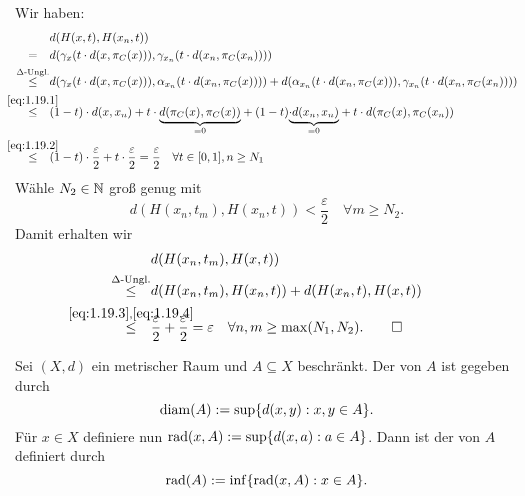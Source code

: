 \begin{beweis}
\begin{figure}[h]
	\end{figure}
	
	Wir haben:
	\begin{align}
		&d(H(x,t),H(x_n,t)) \\
		\stack{}{=} &d(\gamma_x(t\cdot d(x,\pi_C(x))),\gamma_{x_n}(t\cdot d(x_n,\pi_C(x_n)))) \\
		\stack{\Delta\text{-Ungl.}}{\leq} &d(\gamma_x(t\cdot d(x,\pi_C(x))), \alpha_{x_n}(t \cdot d(x_n,\pi_C(x)))) + d(\alpha_{x_n}(t\cdot d(x_n,\pi_C(x))),\gamma_{x_n}(t \cdot d(x_n,\pi_C(x_n)))) \\
		\stack{\eqref{eq:1.19.1}}{\leq} &(1-t)\cdot d(x,x_n) + t \cdot \Underbrace{d(\pi_C(x),\pi_C(x))}{=0} + (1-t) \Underbrace{\cdot d(x_n,x_n)}{=0}  + t \cdot d(\pi_C(x),\pi_C(x_n)) \\
		\stack{\eqref{eq:1.19.2}}{\leq} &(1-t) \cdot \frac{\varepsilon}{2} + t \cdot \frac{\varepsilon}{2} = \frac{\varepsilon}{2} \quad \forall t \in [0,1], n \geq N_1 \label{eq:1.19.3}
	\end{align}
	Wähle $N_2 \in \mathbb{N}$ groß genug mit
	\begin{equation}
		d(H(x_n,t_m),H(x_n,t)) < \frac{\varepsilon}{2} \quad \forall m \geq N_2. \label{eq:1.19.4}
	\end{equation}
	Damit erhalten wir
	\begin{align*}
		&d(H(x_n,t_m),H(x,t)) \\
		\stack{\Delta\text{-Ungl.}}{\leq} &d(H(x_n,t_m),H(x_n,t)) + d(H(x_n,t),H(x,t)) \\
		\stack{\eqref{eq:1.19.3},\eqref{eq:1.19.4}}{\leq} &\frac{\varepsilon}{2} + \frac{\varepsilon}{2} = \varepsilon \quad \forall n,m \geq \max(N_1,N_2). \qedhere
	\end{align*}
\end{beweis}
\newpage
\begin{definition}
\label{def:1.20}
	Sei $(X,d)$ ein metrischer Raum und $A \subseteq X$ beschränkt. 
	Der  von $A$ ist gegeben durch
	\[
		\operatorname{diam}(A) := \sup\{ d(x,y) : x,y \in A\}.
	\]
	Für $x \in X$ definiere nun $\operatorname{rad}(x,A) := \sup\{d(x,a) : a \in A\}$. Dann ist der  von $A$ definiert durch
	\[
		\operatorname{rad}(A) := \inf\{ \operatorname{rad}(x,A) : x \in A\}.
	\]
\end{definition}

